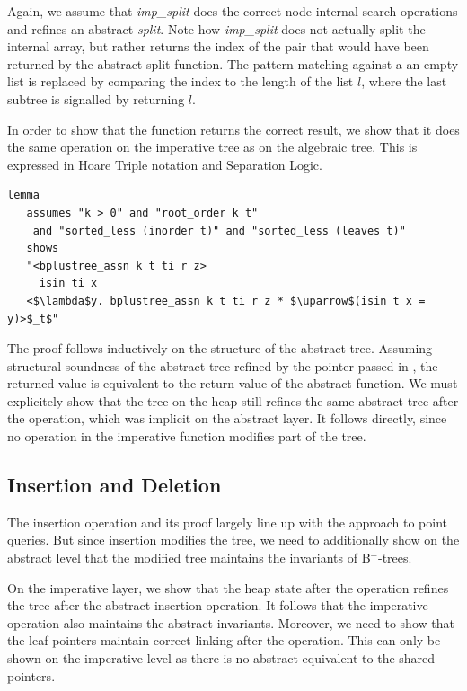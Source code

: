 \documentclass[a4paper,UKenglish,cleveref, autoref, thm-restate]{lipics-v2021}
\newcommand{\btrees}{B$^+$-trees}
\begin{document}
Again, we assume that \emph{imp\_split} does the correct node internal search operations
and refines an abstract \emph{split}.
Note how \emph{imp\_split} does not actually split
the internal array, but rather returns the index of the pair
that would have been returned by the abstract split function.
The pattern matching against a an empty list
is replaced by comparing the index to the length of the list $l$,
where the last subtree is signalled by returning $l$.

In order to show that the function returns the correct result,
we show that it does the same operation on the imperative tree
as on the algebraic tree.
This is expressed in Hoare Triple notation and Separation Logic.

\begin{lstlisting}[mathescape=true, language=Isabelle,label=lst:isin-refines]
lemma  
   assumes "k > 0" and "root_order k t"
    and "sorted_less (inorder t)" and "sorted_less (leaves t)"
   shows
   "<bplustree_assn k t ti r z>
     isin ti x
   <$\lambda$y. bplustree_assn k t ti r z * $\uparrow$(isin t x = y)>$_t$"
\end{lstlisting}

The proof follows inductively on the structure of the abstract tree.
Assuming structural soundness of the abstract tree refined by the pointer passed in ,
the returned value is equivalent to the return value of the abstract function.
We must explicitely show that the tree on the heap
still refines the same abstract tree after the operation,
which was implicit on the abstract layer.
It follows directly, since no operation in the imperative
function modifies part of the tree.

\subsection{Insertion and Deletion}
\label{sec:insert_delete}

The insertion operation and its proof largely line up with the approach to point queries.
But since insertion modifies the tree,
we need to additionally show on the abstract level that the modified tree
maintains the invariants of \btrees.

On the imperative layer, we show that the heap state
after the operation refines the tree
after the abstract insertion operation.
It follows that the imperative operation
also maintains the abstract invariants.
Moreover, we need to show that the leaf pointers
maintain correct linking after the operation.
This can only be shown on the imperative level as there is no abstract equivalent
to the shared pointers.
\end{document}
